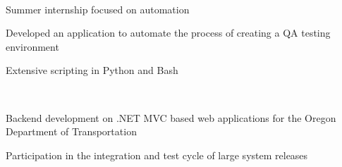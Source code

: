\documentclass[]{hieudo-build}
\begin{document}
\begin{minipage}[t]{0.69\textwidth}
\sectionsep

 \\
\begin{tightemize}
\item Summer internship focused on automation
\item Developed an application to automate the process of creating a QA testing environment
\item Extensive scripting in Python and Bash
\end{tightemize}

\sectionsep

 \\
\begin{tightemize}
\item Backend development on .NET MVC based web applications for the Oregon Department of Transportation
\item Participation in the integration
and test cycle of large system releases
\end{tightemize}
\sectionsep


\sectionsep



\end{minipage} 





\end{document}
